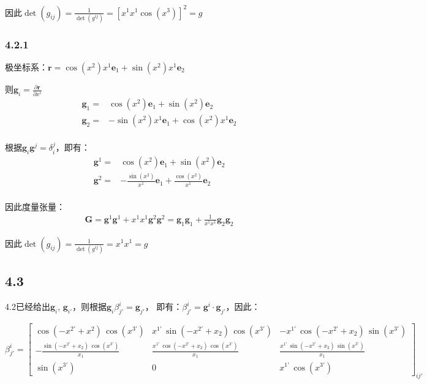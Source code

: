 \documentclass[UTF8,zihao=5]{ctexart}
\newcommand{\bm}[1]{{\mathbf{#1}}}
\newcommand*{\pd}[2]{\frac{\partial #1}{\partial #2}}
\begin{document}
因此$\det(g_{ij})=\frac{1}{\det(g^{ij})}=\left[x^1x^1\cos(x^3)\right]^2=g$

\subsubsection*{4.2.1}

极坐标系：$\bm{r}= \cos{(x^2)} x^1 \bm{e}_1 + \sin{(x^2)} x^1 \bm{e}_2 $

则$\bm{g}_i=\pd{\bm{r}}{x^i}$
$$
    \begin{aligned}
        \bm{g}_1 = & \cos{(x^2)}\bm{e}_1 + \sin{(x^2)}\bm{e}_2        \\
        \bm{g}_2 = & -\sin{(x^2)}x^1\bm{e}_1 + \cos{(x^2)}x^1\bm{e}_2 \\
    \end{aligned}
$$

根据$\bm{g}_i\bm{g}^j=\delta_i^j$，即有：
$$
    \begin{aligned}
        \bm{g}^1 = & \cos{(x^2)}\bm{e}_1 + \sin{(x^2)}\bm{e}_2                          \\
        \bm{g}^2 = & -\frac{\sin{(x^2)}}{x^1}\bm{e}_1 + \frac{\cos{(x^2)}}{x^1}\bm{e}_2 \\
    \end{aligned}
$$

因此度量张量：
$$
    \begin{aligned}
        \bm{G}=\bm{g}^1\bm{g}^1 + x^1x^1 \bm{g}^2\bm{g}^2
        =\bm{g}_1\bm{g}_1 + \frac{1}{x^1x^1} \bm{g}_2\bm{g}_2
    \end{aligned}
$$

因此$\det(g_{ij})=\frac{1}{\det(g^{ij})}=x^1x^1=g$

\subsection*{4.3}


4.2已经给出$\bm{g}_i,\,\bm{g}_{i'}$，则根据$\bm{g}_i\beta_{j'}^{i}=\bm{g}_{j'}$，
即有：$\beta_{j'}^{i}=\bm{g}^i\cdot\bm{g}_{j'}$，因此：

$$
    \beta^i_{j'}=
    \left[\begin{array}{ccc} \cos\left(-x^{2'}+x^{2}\right)\,\cos\left(x^{3'}\right) & x^{1'}\,\sin\left(-x^{2'}+x_{2}\right)\,\cos\left(x^{3'}\right) & -x^{1'}\,\cos\left(-x^{2'}+x_{2}\right)\,\sin\left(x^{3'}\right)\\ -\frac{\sin\left(-x^{2'}+x_{2}\right)\,\cos\left(x^{3'}\right)}{x_{1}} & \frac{x^{1'}\,\cos\left(-x^{2'}+x_{2}\right)\,\cos\left(x^{3'}\right)}{x_{1}} & \frac{x^{1'}\,\sin\left(-x^{2'}+x_{2}\right)\,\sin\left(x^{3'}\right)}{x_{1}}\\ \sin\left(x^{3'}\right) & 0 & x^{1'}\,\cos\left(x^{3'}\right) \end{array}\right]_{ij'}
$$
\end{document}
